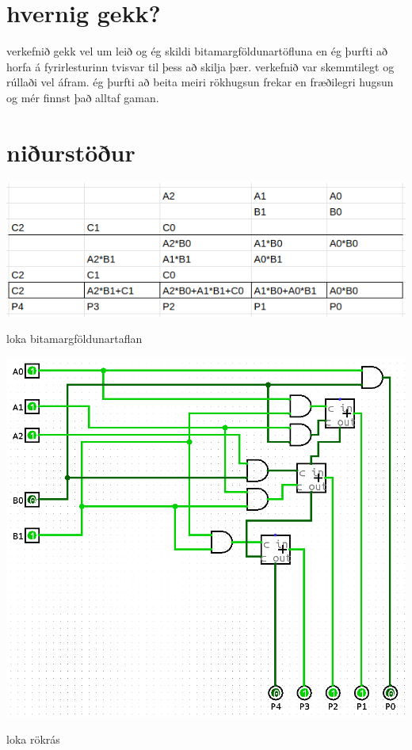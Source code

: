 \documentclass{article}
\begin{document}
\section*{hvernig gekk?}
verkefnið gekk vel um leið og ég skildi bitamargföldunartöfluna en ég þurfti að horfa á fyrirlesturinn tvisvar til þess að skilja þær.
verkefnið var skemmtilegt og rúllaði vel áfram. ég þurfti að beita meiri rökhugsun frekar en fræðilegri hugsun og mér finnst það alltaf gaman.

\section*{niðurstöður}
\begin{center}
    \includegraphics[scale=0.55]{imgs/Screenshot from 2022-03-11 10-23-10.png}
\end{center}
loka bitamargföldunartaflan

\begin{center}
    \includegraphics[scale=0.4]{imgs/Screenshot from 2022-03-11 10-51-59.png}
\end{center}
loka rökrás
\end{document}
